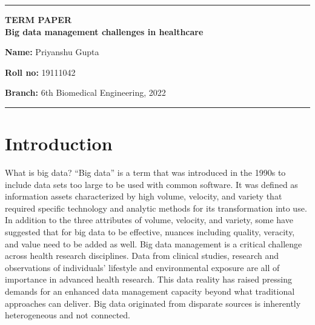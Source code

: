 \documentclass[10pt,a4paper,twoside]{article}
\begin{document}
\begin{center}
\hrule

\vspace{.4cm}
{\bf {\Large TERM PAPER  }}\\
\vspace{.3cm}
{\bf {\huge Big data management challenges in healthcare }}
\vspace{.3cm}
\end{center}

{\bf Name:}  Priyanshu Gupta

{\bf Roll no:}  19111042 

{\bf Branch: } 6th Biomedical Engineering, 2022 
\\
\hrule

\vspace{.3cm}
\section*{Introduction} 
What is big data? “Big data” is a term that was introduced in the 1990s to include data sets too large to be used with common software. It was defined as information assets characterized by high volume, velocity, and variety that required specific technology and analytic methods for its transformation into use. In addition to the three attributes of volume, velocity, and variety, some have suggested that for big data to be effective, nuances including quality, veracity, and value need to be added as well. 
Big data management is a critical challenge across health research disciplines. Data from clinical studies, research and observations of individuals’ lifestyle and environmental exposure are all of importance in advanced health research. This data reality has raised pressing demands for an enhanced data management capacity beyond what traditional approaches can deliver. Big data originated from disparate sources is inherently heterogeneous and not connected. 
\end{document}
